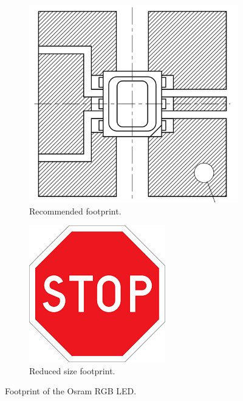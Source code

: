 \begin{figure}[H]
	\begin{subfigure}[t]{.49\linewidth}
		\centering
		\includegraphics[width=.8\linewidth]{images/rgbfootprint}
		\caption{Recommended footprint.}
		\label{fig:recommendedfootprint}
	\end{subfigure}
	\begin{subfigure}[t]{.49\linewidth}
		\centering
		\includegraphics[width=.8\linewidth]{images/stop}
		\caption{Reduced size footprint.}
		\label{fig:finalfootprint}
	\end{subfigure}
	\caption{Footprint of the Osram RGB LED.}
	\label{fig:footprint}
\end{figure}


